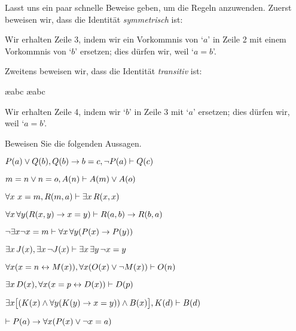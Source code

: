 Lasst uns ein paar schnelle Beweise geben, um die Regeln anzuwenden. Zuerst beweisen wir, dass die Identität \emph{symmetrisch} ist:
\begin{fitchproof}
	\open
	\close
\end{fitchproof}
Wir erhalten Zeile 3, indem wir ein Vorkommnis von `$a$' in Zeile 2 mit einem Vorkommnis von `$b$' ersetzen; dies dürfen wir, weil `$a= b$'. 

Zweitens beweisen wir, dass die Identität \emph{transitiv} ist:
\begin{fitchproof}
	\open
		\ae{abc}
		\ae{abc}
	\close
\end{fitchproof}
Wir erhalten Zeile 4, indem wir `$b$' in Zeile 3 mit `$a$' ersetzen; dies dürfen wir, weil `$a= b$'. 

\practiceproblems
\problempart
\label{pr.identity}
Beweisen Sie die folgenden Aussagen.
\begin{earg}
\item $\mathord{P}(a) \vee \mathord{Q}(b), \mathord{Q}(b) \rightarrow b=c, \neg\mathord{P}(a) \vdash \mathord{Q}(c)$
\item $m=n \vee n=o, \mathord{A}(n) \vdash \mathord{A}(m) \vee \mathord{A}(o)$
\item $\forall x\ x=m, \mathord{R}(m,a) \vdash \exists x\,\mathord{R}(x,x)$
\item $\forall x\,\forall y(\mathord{R}(x,y) \rightarrow x=y)\vdash \mathord{R}(a,b) \rightarrow \mathord{R}(b,a)$
\item $\neg \exists x\neg x = m \vdash \forall x\,\forall y (\mathord{P}(x) \rightarrow \mathord{P}(y))$
\item $\exists x\,\mathord{J}(x), \exists x\, \neg\mathord{J}(x)\vdash \exists x\, \exists y\, \neg x = y$
\item $\forall x(x=n \leftrightarrow \mathord{M}(x)), \forall x(\mathord{O}(x) \vee \neg \mathord{M}(x))\vdash \mathord{O}(n)$
\item $\exists x\,\mathord{D}(x), \forall x(x=p \leftrightarrow \mathord{D}(x))\vdash \mathord{D}(p)$
\item $\exists x\bigl[(\mathord{K}(x) \wedge \forall y(\mathord{K}(y) \rightarrow x=y)) \wedge \mathord{B}(x)\bigr], \mathord{K}(d)\vdash \mathord{B}(d)$
\item $\vdash \mathord{P}(a) \rightarrow \forall x(\mathord{P}(x) \vee \neg x = a)$
\end{earg}

